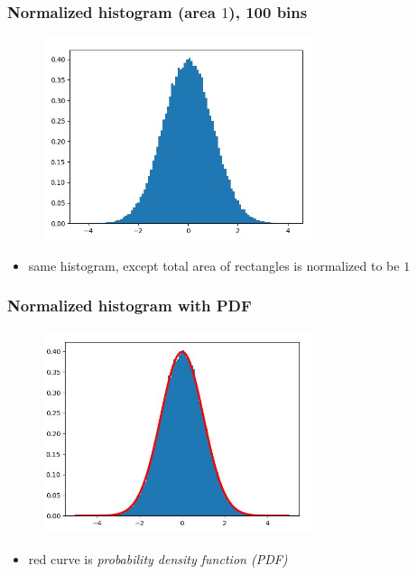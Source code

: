 \documentclass[english,14pt]{beamer}
\newcommand\red[1]{{\color{red} #1}}
\begin{document}

\begin{frame}[fragile]

\frametitle{Normalized histogram (area $1$), 100 bins}

\begin{figure}[ht]
	\centering
	\includegraphics[width=0.7\textwidth]{figures/hist100BinsDensity}
\end{figure}

\vspace*{-5mm}

\begin{itemize}
	\item same histogram, except total area of rectangles is normalized to be $1$
\end{itemize}

\end{frame}



\begin{frame}[fragile]

\frametitle{Normalized histogram with PDF}

\begin{figure}[ht]
	\centering
	\includegraphics[width=0.7\textwidth]{figures/histWithpdf}
\end{figure}

\vspace*{-5mm}

\begin{itemize}
	\item[] red curve is \red{\emph{probability density function (PDF)}}
\end{itemize}

\end{frame}
\end{document}

